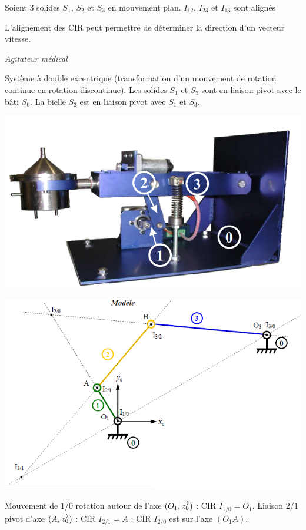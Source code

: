 \documentclass[11pt,oneside]{article}
\begin{document}
\begin{theo}
Soient 3 solides $S_1$, $S_2$ et $S_3$ en mouvement plan. $I_{12}$, $I_{23}$ et $I_{13}$ sont alignés
\end{theo}

\begin{resultat}
L'alignement des CIR peut permettre de déterminer la direction d'un vecteur vitesse.
\end{resultat}

\begin{exemple}
\textit{Agitateur médical}

Système à double excentrique (transformation d'un mouvement de rotation continue en rotation discontinue). Les solides $S_1$ et $S_3$ sont en liaison pivot avec le bâti $S_0$. La bielle $S_2$ est en liaison pivot avec $S_1$ et $S_3$.

\begin{minipage}[c]{.4\linewidth}
\begin{center}
\includegraphics[width=\textwidth]{png/img6_1}
\end{center}
\end{minipage}\hfill
\begin{minipage}[c]{.5\linewidth}
\begin{center}
\includegraphics[width=\textwidth]{png/img6}
\end{center}
\end{minipage}
Mouvement de $1/0$ rotation autour de l'axe $(O_1,\overrightarrow{z_0})$ : CIR $I_{1/0}=O_1$. 
Liaison $2/1$ pivot d'axe $(A,\overrightarrow{z_0})$ : CIR $I_{2/1}=A$ : CIR $I_{2/0}$ est sur l'axe $(O_1 A)$.


\end{exemple}
\end{document}
